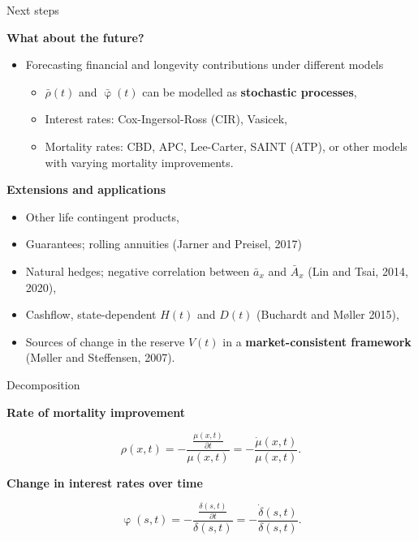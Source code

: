 \documentclass[10pt]{beamer}
\begin{document}
\begin{frame}{Next steps}

\textbf{What about the future?}

\begin{itemize}
	\item Forecasting financial and longevity contributions under different models \pause
	\begin{itemize}
		\item $\bar{\rho}(t)$ and $\bar{\upvarphi}(t)$ can be modelled as \textbf{stochastic processes}, \pause
		\item Interest rates: Cox-Ingersol-Ross (CIR), Vasicek, \pause
		\item Mortality rates: CBD, APC, Lee-Carter, SAINT (ATP), or other models with varying mortality improvements. \pause
	\end{itemize} 
\end{itemize}


\textbf{Extensions and applications} \pause
\begin{itemize}
	\item Other life contingent products, \pause
	\item Guarantees; rolling annuities (Jarner and Preisel, 2017)
	\item Natural hedges; negative correlation between $\bar{a}_x$ and $\bar{A}_x$ (Lin and Tsai, 2014, 2020), \pause
	\item Cashflow, state-dependent $H(t)$ and $D(t)$ (Buchardt and M\o ller 2015), \pause
	\item Sources of change in the reserve $V(t)$ in a \textbf{market-consistent framework} (M\o ller and  Steffensen, 2007). 
\end{itemize}


\end{frame}



\begin{frame}{Decomposition}

\textbf{Rate of mortality improvement}

\begin{equation} \label{eq:rho}
\rho(x,t)=-\frac{\frac{\mu(x,t)}{\partial t}}{\mu(x,t)} = - \frac{\dot{\mu}(x,t)}{\mu(x,t)}.
\end{equation}

\textbf{Change in interest rates over time}

\begin{equation} \label{eq:phi}
\upvarphi(s,t)=-\frac{\frac{\delta(s,t)}{\partial t}}{\delta(s,t)} = -\frac{\dot{\delta}(s,t)}{\delta(s,t)}.
\end{equation}

\end{frame}
\end{document}
